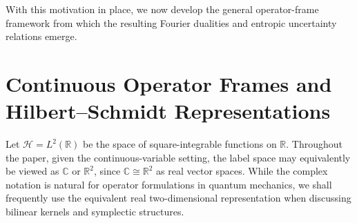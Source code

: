 \documentclass[aps,pra,onecolumn,nofootinbib,superscriptaddress,showpacs]{revtex4}
\begin{document}
 
With this motivation in place, we now develop the
general operator-frame framework from which the
resulting Fourier dualities and entropic uncertainty
relations emerge.




\section {Continuous Operator Frames and Hilbert--Schmidt Representations}
\noindent Let \(\mathcal H=L^2(\mathbb R)\) be the space of square-integrable functions on $\mathbb{R}$. Throughout the paper, given the continuous-variable setting, the label space may equivalently be viewed as $\mathbb C$ or $\mathbb R^2$, since
$\mathbb C \cong \mathbb R^2$ as real vector spaces. While the complex
notation is natural for operator formulations in quantum
mechanics, we shall frequently use the equivalent real two-dimensional
representation when discussing bilinear kernels and symplectic
structures. 
\end{document}
